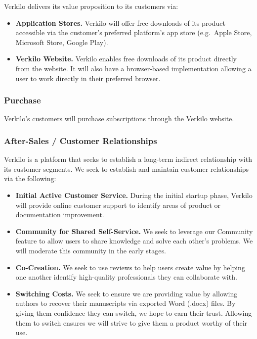 \documentclass[11pt,openany]{book}
\providecommand{\tightlist}{%
  \setlength{\itemsep}{0pt}\setlength{\parskip}{0pt}}
\begin{document}
Verkilo delivers its value proposition to its customers via:

\begin{itemize}
\tightlist
\item
  \textbf{Application Stores.} Verkilo will offer free downloads of its
  product accessible via the customer's preferred platform's app store
  (e.g.~Apple Store, Microsoft Store, Google Play).
\item
  \textbf{Verkilo Website.} Verkilo enables free downloads of its
  product directly from the website. It will also have a browser-based
  implementation allowing a user to work directly in their preferred
  browser.
\end{itemize}

\hypertarget{purchase}{%
\subsubsection{Purchase}\label{purchase}}

Verkilo's customers will purchase subscriptions through the Verkilo
website.

\hypertarget{after-sales-customer-relationships}{%
\subsubsection{After-Sales / Customer
Relationships}\label{after-sales-customer-relationships}}

Verkilo is a platform that seeks to establish a long-term indirect
relationship with its customer segments. We seek to establish and
maintain customer relationships via the following:

\begin{itemize}
\tightlist
\item
  \textbf{Initial Active Customer Service.} During the initial startup
  phase, Verkilo will provide online customer support to identify areas
  of product or documentation improvement.
\item
  \textbf{Community for Shared Self-Service.} We seek to leverage our
  Community feature to allow users to share knowledge and solve each
  other's problems. We will moderate this community in the early stages.
\item
  \textbf{Co-Creation.} We seek to use reviews to help users create
  value by helping one another identify high-quality professionals they
  can collaborate with.
\item
  \textbf{Switching Costs.} We seek to ensure we are providing value by
  allowing authors to recover their manuscripts via exported Word
  (.docx) files. By giving them confidence they can switch, we hope to
  earn their trust. Allowing them to switch ensures we will strive to
  give them a product worthy of their use.
\end{itemize}
\end{document}
